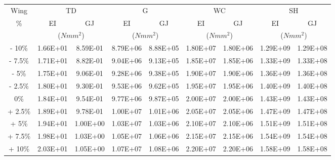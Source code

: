 \documentclass{standalone}
\begin{document}
    \centering
    \begin{tabular}{c | c c | c c | c c | c c}
    \toprule
    \toprule
    Wing & \multicolumn{2}{c}{TD}&\multicolumn{2}{c}{G}&\multicolumn{2}{c}{WC}&\multicolumn{2}{c}{SH}\\
    \% & EI & GJ & EI & GJ & EI & GJ & EI & GJ\\
     & \multicolumn{2}{c}{($Nmm^2$)}& \multicolumn{2}{c}{($Nmm^2$)}& \multicolumn{2}{c}{($Nmm^2$)}& \multicolumn{2}{c}{($Nmm^2$)}\\
    \midrule
    - 10\% & 1.66E+01 & 8.59E-01 & 8.79E+06 & 8.88E+05 & 1.80E+07 & 1.80E+06 & 1.29E+09 & 1.29E+08  \\
    - 7.5\% & 1.71E+01 & 8.82E-01 & 9.04E+06 & 9.13E+05 & 1.85E+07 & 1.85E+06 & 1.33E+09 & 1.33E+08 \\
    - 5\% & 1.75E+01 & 9.06E-01 & 9.28E+06 & 9.38E+05 & 1.90E+07 & 1.90E+06 & 1.36E+09 & 1.36E+08  \\
    - 2.5\% & 1.80E+01 & 9.30E-01 & 9.53E+06 & 9.62E+05 & 1.95E+07 & 1.95E+06 & 1.40E+09 & 1.40E+08  \\
    0\% & 1.84E+01 & 9.54E-01 & 9.77E+06 & 9.87E+05 & 2.00E+07 & 2.00E+06 & 1.43E+09 & 1.43E+08  \\
    + 2.5\% & 1.89E+01 & 9.78E-01 & 1.00E+07 & 1.01E+06 & 2.05E+07  & 2.05E+06 & 1.47E+09 & 1.47E+08  \\
    + 5\% & 1.94E+01 & 1.00E+00 & 1.03E+07 & 1.03E+06 & 2.10E+07  & 2.10E+06 & 1.51E+09 & 1.51E+08  \\
    + 7.5\% & 1.98E+01 & 1.03E+00 & 1.05E+07 & 1.06E+06 & 2.15E+07  & 2.15E+06 & 1.54E+09 & 1.54E+08  \\
    + 10\% & 2.03E+01 & 1.05E+00 & 1.07E+07 & 1.08E+06 & 2.20E+07  & 2.20E+06 & 1.58E+09 & 1.58E+08  \\
    \bottomrule
    \bottomrule
    \end{tabular}
    
\end{document}

